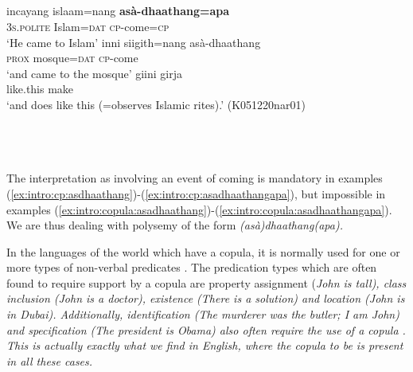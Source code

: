 \documentclass[a4paper,12pt]{article}
\newcommand{\xbox}[2]{\noindent\parbox[t]{#1}{#2}\noindent}
\newcommand{\xref}[1]{(\ref{#1})}
\newcommand{\ea}{\\\\}
\newcommand{\z}{\\\\}
\begin{document}
 

% 
% 
 


\xbox{\textwidth}{
\ea\label{ex:intro:cp:asadhaathangapa} 
\ea
\gll incayang  islaam=nang   \textbf{asà-dhaathang=apa}  \\
     \textsc{3s}.\textsc{polite} Islam=\textsc{dat} \textsc{cp}-come=\textsc{cp} \\
    `He came to Islam'
\ex
\gll inni     siigith=nang    asà-dhaathang \\
     \textsc{prox} mosque=\textsc{dat} \textsc{cp}-come  \\
    `and came to the mosque'
\ex
\gll giini    girja \\
     like.this make  \\
    `and does like this (=observes Islamic rites).' (K051220nar01)
\z
\z
} 
 

The interpretation as involving an event of coming is mandatory in examples \xref{ex:intro:cp:asdhaathang}-\xref{ex:intro:cp:asadhaathangapa}, but impossible in examples \xref{ex:intro:copula:asadhaathang}-\xref{ex:intro:copula:asadhaathangapa}. We are thus dealing with polysemy of the form \em (asà)dhaathang(apa)\em.
 
In the languages of the world which have a copula, it is normally used for one or more types of non-verbal predicates \citep{Stassen1997}. The predication types which are often found to require support by a copula are property assignment (\em John is tall\em), class inclusion (\em John is a doctor\em), existence (\em There is a solution\em) and location (\em John is in Dubai\em). Additionally, identification (\em The murderer was the butler; I am John\em) and specification (\em The president is Obama\em) also often require the use of a copula \citep{Hengeveld1992nvpttd}. This is actually exactly what we find in English, where the copula \em to be \em is present in all these cases.
\end{document}
